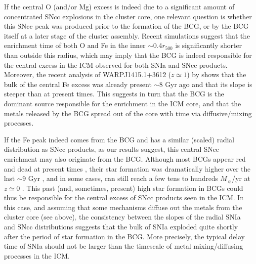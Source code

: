 \documentclass{aa}
\begin{document}
If the central O (and/or Mg) excess is indeed due to a significant amount of concentrated SNcc explosions in the cluster core, one relevant question is whether this SNcc peak was produced prior to the formation of the BCG, or by the BCG itself at a later stage of the cluster assembly. 
Recent simulations \citep{2007MNRAS.382.1050T,2010MNRAS.401.1670F} suggest that the enrichment time of both O and Fe in the inner  $\sim$0.4$r_{500}$ is significantly shorter than outside this radius, which may imply that the BCG is indeed responsible for the central excess in the ICM observed for both SNIa and SNcc products. Moreover, the recent analysis of WARPJ1415.1+3612 ($z \simeq 1$) by \citet{2014A&A...567A.102D} shows that the bulk of the central Fe excess was already present $\sim$8 Gyr ago and that its slope is steeper than at present times. This suggests in turn that the BCG is the dominant source responsible for the enrichment in the ICM core, and that the metals released by the BCG spread out of the core with time via diffusive/mixing processes.

If the Fe peak indeed comes from the BCG \citep[as the Fe mass in the ICM could suggest;][]{2004A&A...416L..21B,2004A&A...419....7D} and has a similar (scaled) radial distribution as SNcc products, as our results suggest, this central SNcc enrichment may also originate from the BCG. Although most BCGs appear red and dead at present times \citep[with typical star formation rates of a few $M_\sun$/yr at most; e.g.][]{2011ApJ...734...95M}, their star formation was dramatically higher over the last $\sim$9 Gyr \citep{2016ApJ...817...86M}, and in some cases, can still reach a few tens to hundreds $M_\sun$/yr at $z \simeq 0$ \citep{2008ApJ...681.1035O}. This past (and, sometimes, present) high star formation in BCGs could thus be responsible  for the central excess of SNcc products seen in the ICM. In this case, and assuming that some mechanisms diffuse out the metals from the cluster core (see above), the consistency between the slopes of the radial SNIa and SNcc distributions suggests that the bulk of SNIa exploded quite shortly after the period of star formation in the BCG. More precisely, the typical delay time of SNIa should not be larger than the timescale of metal mixing/diffusing processes in the ICM. 
\end{document}
